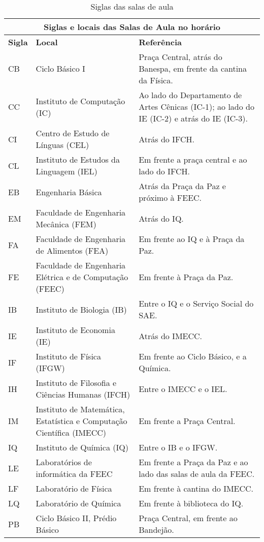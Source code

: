 \begin{center}
\begin{table*}[ht!]
{
\begin{tabular}{|l|p{6cm}|p{8cm}|}\hline

\multicolumn{3}{|c|}{ \textbf{Siglas e locais das Salas de Aula no horário}}\tabularnewline \hline

 \textbf{Sigla}  &  \textbf{Local}  &  \textbf{Referência}\tabularnewline \hline

 CB  &  Ciclo Básico I  &  Praça Central, atrás do Banespa, em frente da cantina da Física.\tabularnewline \hline

 CC  &  Instituto de Computação (IC)  &  Ao lado do Departamento de Artes Cênicas (IC-1); ao lado do IE (IC-2) e atrás do IE (IC-3).\tabularnewline \hline

 CI  &  Centro de Estudo de Línguas (CEL)  &  Atrás do IFCH.\tabularnewline \hline

 CL  &  Instituto de Estudos da Linguagem (IEL)  &  Em frente a praça central e ao lado do IFCH.\tabularnewline \hline

 EB  &  Engenharia Básica  &  Atrás da Praça da Paz e próximo à FEEC.\tabularnewline \hline

 EM  &  Faculdade de Engenharia Mecânica (FEM)  &  Atrás do IQ.\tabularnewline \hline

 FA  &  Faculdade de Engenharia de Alimentos (FEA)  &  Em frente ao IQ e à Praça da Paz.\tabularnewline \hline

 FE  &  Faculdade de Engenharia Elétrica e de Computação (FEEC)  &  Em frente à Praça da Paz.\tabularnewline \hline

 IB  &  Instituto de Biologia (IB)  &  Entre o IQ e o Serviço Social do SAE.\tabularnewline \hline

 IE  &  Instituto de Economia (IE)  &  Atrás do IMECC.\tabularnewline \hline

 IF  &  Instituto de Física (IFGW)  &  Em frente ao Ciclo Básico, e a Química.\tabularnewline \hline

 IH  &  Instituto de Filosofia e Ciências Humanas (IFCH)  &  Entre o IMECC e o IEL.\tabularnewline \hline

 IM  &  Instituto de Matemática, Estatística e Computação Científica (IMECC)  &  Em frente a Praça Central.\tabularnewline \hline

 IQ  &  Instituto de Química (IQ)  &  Entre o IB e o IFGW.\tabularnewline \hline

 LE  &  Laboratórios de informática da FEEC  &  Em frente a Praça da Paz e ao lado das salas de aula da FEEC.\tabularnewline \hline

 LF  &  Laboratório de Física  &  Em frente à cantina do IMECC.\tabularnewline \hline

 LQ  &  Laboratório de Química  &  Em frente à biblioteca do IQ.\tabularnewline \hline

 PB  &  Ciclo Básico II, Prédio Básico  &  Praça Central, em frente ao Bandejão.\tabularnewline \hline

\end{tabular}
}
\hfill{}
\caption{Siglas das salas de aula}
\label{tab:institutos}
\end{table*}
\end{center}

